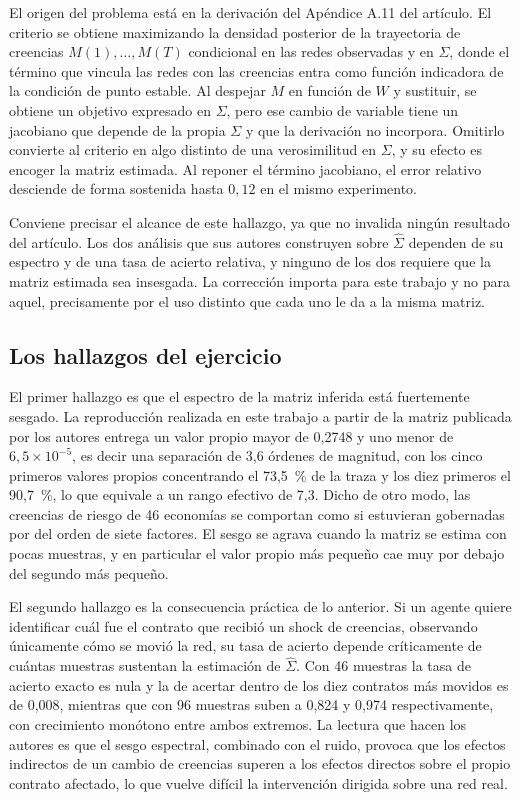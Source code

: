 El origen del problema está en la derivación del Apéndice A.11 del artículo. El criterio se obtiene maximizando la densidad posterior de la trayectoria de creencias $M(1),\dots,M(T)$ condicional en las redes observadas y en $\Sigma$, donde el término que vincula las redes con las creencias entra como función indicadora de la condición de punto estable. Al despejar $M$ en función de $W$ y sustituir, se obtiene un objetivo expresado en $\Sigma$, pero ese cambio de variable tiene un jacobiano que depende de la propia $\Sigma$ y que la derivación no incorpora. Omitirlo convierte al criterio en algo distinto de una verosimilitud en $\Sigma$, y su efecto es encoger la matriz estimada. Al reponer el término jacobiano, el error relativo desciende de forma sostenida hasta $0{,}12$ en el mismo experimento.

Conviene precisar el alcance de este hallazgo, ya que no invalida ningún resultado del artículo. Los dos análisis que sus autores construyen sobre $\hat\Sigma$ dependen de su espectro y de una tasa de acierto relativa, y ninguno de los dos requiere que la matriz estimada sea insesgada. La corrección importa para este trabajo y no para aquel, precisamente por el uso distinto que cada uno le da a la misma matriz.

\subsection{Los hallazgos del ejercicio}
\label{c4:ocde-hallazgos}

El primer hallazgo es que el espectro de la matriz inferida está fuertemente sesgado. La reproducción realizada en este trabajo a partir de la matriz publicada por los autores entrega un valor propio mayor de 0,2748 y uno menor de $6,5\times 10^{-5}$, es decir una separación de 3,6 órdenes de magnitud, con los cinco primeros valores propios concentrando el 73,5~\% de la traza y los diez primeros el 90,7~\%, lo que equivale a un rango efectivo de 7,3. Dicho de otro modo, las creencias de riesgo de 46 economías se comportan como si estuvieran gobernadas por del orden de siete factores. El sesgo se agrava cuando la matriz se estima con pocas muestras, y en particular el valor propio más pequeño cae muy por debajo del segundo más pequeño.

El segundo hallazgo es la consecuencia práctica de lo anterior. Si un agente quiere identificar cuál fue el contrato que recibió un shock de creencias, observando únicamente cómo se movió la red, su tasa de acierto depende críticamente de cuántas muestras sustentan la estimación de $\hat\Sigma$. Con 46 muestras la tasa de acierto exacto es nula y la de acertar dentro de los diez contratos más movidos es de 0,008, mientras que con 96 muestras suben a 0,824 y 0,974 respectivamente, con crecimiento monótono entre ambos extremos. La lectura que hacen los autores es que el sesgo espectral, combinado con el ruido, provoca que los efectos indirectos de un cambio de creencias superen a los efectos directos sobre el propio contrato afectado, lo que vuelve difícil la intervención dirigida sobre una red real.

